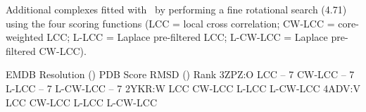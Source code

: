 \caption{}
{Additional complexes fitted with \powerfit\ by performing a fine rotational
search (4.71\Deg) using the four scoring functions (LCC = local cross correlation;
CW-LCC = core-weighted LCC; L-LCC = Laplace pre-filtered LCC; L-CW-LCC = Laplace
pre-filtered CW-LCC).}
\stopbuffer

\bTABLE
\setupTABLE[r][2,3,4,5,10,11,12,13][background=color, 
    backgroundcolor=tableoddrow]
\setupTABLE[r][6,7,8,9][background=color, backgroundcolor=white]
\bTABLEhead
\bTR \bTD EMDB \eTD \bTD Resolution (\Angstrom) \eTD \bTD PDB \eTD \bTD Score \eTD \bTD RMSD (\Angstrom) \eTD \bTD Rank \eTD \eTR
\eTABLEhead
\bTABLEbody
\bTR {} \eTD {} \eTD \bTD[nr=4] 3ZPZ:O \eTD \bTD LCC \eTD {} \eTD {} -- 7 \eTD \eTR
\bTR \bTD CW-LCC \eTD {} \eTD {} -- 7 \eTD \eTR
\bTR \bTD L-LCC \eTD {} \eTD {} -- 7 \eTD \eTR
\bTR \bTD L-CW-LCC \eTD {} \eTD {} -- 7 \eTD \eTR
%
\bTR {} \eTD {} \eTD \bTD[nr=4] 2YKR:W \eTD \bTD LCC \eTD {} \eTD {} \eTD \eTR
\bTR \bTD CW-LCC \eTD {} \eTD {} \eTD \eTR
\bTR \bTD L-LCC \eTD {} \eTD {} \eTD \eTR
\bTR \bTD L-CW-LCC \eTD {} \eTD {} \eTD \eTR
%
\bTR {} \eTD {} \eTD \bTD[nr=4] 4ADV:V \eTD \bTD LCC \eTD {} \eTD {} \eTD \eTR
\bTR \bTD CW-LCC \eTD {} \eTD {} \eTD \eTR
\bTR \bTD L-LCC \eTD {} \eTD {} \eTD \eTR
\bTR \bTD L-CW-LCC \eTD {} \eTD {} \eTD \eTR
\eTABLEbody
\eTABLE
\stopbuffer
